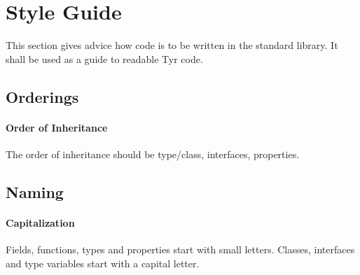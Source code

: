 \section{Style Guide}

This section gives advice how code is to be written in the standard library.
It shall be used as a guide to readable Tyr code.

\subsection{Orderings}

\paragraph{Order of Inheritance}
The order of inheritance should be type/class, interfaces, properties.


\subsection{Naming}

\paragraph{Capitalization}

Fields, functions, types and properties start with small letters.
Classes, interfaces and type variables start with a capital letter.